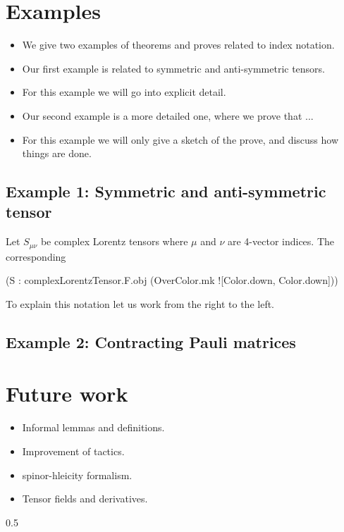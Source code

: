\documentclass[a4paper, 11pt]{article}
\begin{document}
\section{Examples}

\begin{itemize}
\item We give two examples of theorems and proves related to index notation.
\item Our first example is related to symmetric and anti-symmetric tensors. 
\item For this example we will go into explicit detail.
\item Our second example is a more detailed one, where we prove that ... 
\item For this example we will only give a sketch of the prove, and discuss how things are done.
\end{itemize}

\subsection{Example 1: Symmetric and anti-symmetric tensor}

Let  $S_{\mu \nu}$ be complex Lorentz tensors where $\mu$ and $\nu$ are 
4-vector indices. The corresponding 
\begin{code}
(S : complexLorentzTensor.F.obj (OverColor.mk ![Color.down, Color.down]))
\end{code}

To explain this notation let us work from the right to the left.

\subsection{Example 2: Contracting Pauli matrices}


\section{Future work}

\begin{itemize}
\item Informal lemmas and definitions. 
\item Improvement of tactics. 
\item spinor-hleicity formalism. 
\item Tensor fields and derivatives. 
\end{itemize}

\begin{spacing}{0.5}

\end{spacing}


\end{document}
